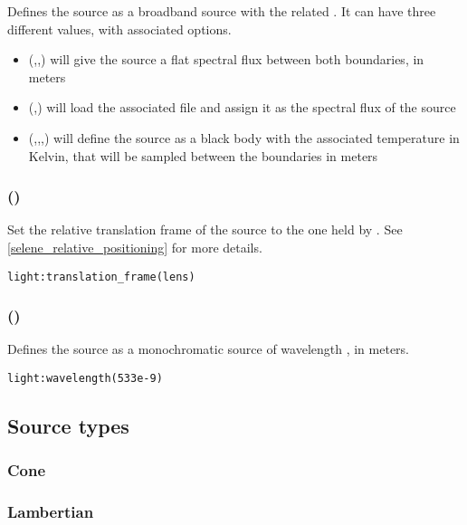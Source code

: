 Defines the source as a broadband source with the related . It can have three different values, with associated options.
\begin{itemize}
	\item {}(,,) will give the source a flat spectral flux between both boundaries, in meters
	\item {}(,) will load the associated file and assign it as the spectral flux of the source
	\item {}(,,,) will define the source as a black body with the associated temperature in Kelvin, that will be sampled between the boundaries in meters
\end{itemize}

\subsubsection[translation\_frame]{()}

Set the relative translation frame of the source to the one held by . See \ref{selene_relative_positioning} for more details.
\begin{lstlisting}
light:translation_frame(lens)
\end{lstlisting}

\subsubsection[wavelength]{()}

Defines the source as a monochromatic source of wavelength , in meters.
\begin{lstlisting}
light:wavelength(533e-9)
\end{lstlisting}

\subsection{Source types}

\subsubsection{Cone}

\subsubsection{Lambertian}

